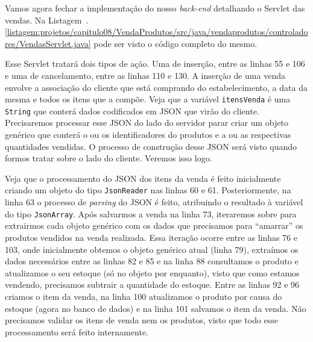 Vamos agora fechar a implementação do nosso \textit{back-end} detalhando o Servlet das vendas. Na Listagem~\thechapter.\ref{listagem:projetos/capitulo08/VendaProdutos/src/java/vendaprodutos/controladores/VendasServlet.java} pode ser visto o código completo do mesmo.


Esse Servlet tratará dois tipos de ação. Uma de inserção, entre as linhas 55 e 106 e uma de cancelamento, entre as linhas 110 e 130. A inserção de uma venda envolve a associação do cliente que está comprando do estabelecimento, a data da mesma e todos os itens que a compõe. Veja que a variável \texttt{itensVenda} é uma \texttt{String} que conterá dados codificados em JSON que virão do cliente. Precisaremos processar esse JSON do lado do servidor parar criar um objeto genérico que conterá o ou os identificadores do produtos e a ou as respectivas quantidades vendidas. O processo de construção desse JSON será visto quando formos tratar sobre o lado do cliente. Veremos isso logo.

Veja que o processamento do JSON dos itens da venda é feito inicialmente criando um objeto do tipo \texttt{JsonReader} nas linhas 60 e 61. Posteriormente, na linha 63 o processo de \textit{parsing} do JSON é feito, atribuindo o resultado à variável  do tipo \texttt{JsonArray}. Após salvarmos a venda na linha 73, iteraremos sobre  para extrairmos cada objeto genérico com os dados que precisamos para ``amarrar'' os produtos vendidos na venda realizada. Essa iteração ocorre entre as linhas 76 e 103, onde inicialmente obtemos o objeto genérico atual (linha 79), extraímos os dados necessários entre as linhas 82 e 85 e na linha 88 consultamos o produto e atualizamos o seu estoque (só no objeto por enquanto), visto que como estamos vendendo, precisamos subtrair a quantidade do estoque. Entre as linhas 92 e 96 criamos o item da venda, na linha 100 atualizamos o produto por causa do estoque (agora no banco de dados) e na linha 101 salvamos o item da venda. Não precisamos validar os itens de venda nem os produtos, visto que todo esse processamento será feito internamente.

